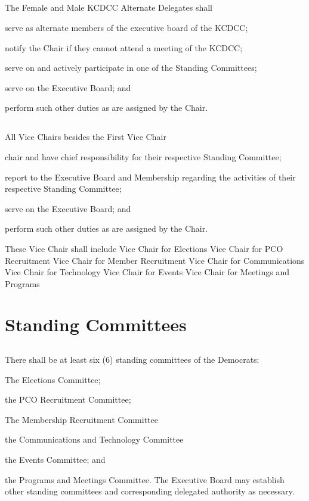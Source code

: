 \subsection{}
The Female and Male KCDCC Alternate Delegates shall
\begin{inlinealphalist}
    \item serve as alternate members of the executive board of the KCDCC;
    \item notify the Chair if they cannot attend a meeting of the KCDCC;
    \item serve on and actively participate in one of the Standing Committees;
    \item serve on the Executive Board; and
    \item perform such other duties as are assigned by the Chair.
\end{inlinealphalist}

\subsection{}
All Vice Chairs besides the First Vice Chair
\begin{inlinealphalist}
    \item chair and have chief responsibility for their respective Standing Committee;
    \item report to the Executive Board and Membership regarding the activities of their respective Standing Committee;
    \item serve on the Executive Board; and
    \item perform such other duties as are assigned by the Chair.
\end{inlinealphalist}

These Vice Chair shall include
Vice Chair for Elections
Vice Chair for PCO Recruitment
Vice Chair for Member Recruitment
Vice Chair for Communications
Vice Chair for Technology
Vice Chair for Events
Vice Chair for Meetings and Programs

\section{Standing Committees}
\subsection{} \label{standing-committee-list}
There shall be at least six (6) standing committees of the \fortythird{}  Democrats:
\begin{inlinealphalist}
    \item The Elections Committee;
    \item the PCO Recruitment Committee;
    \item The Membership Recruitment Committee
    \item the Communications and Technology Committee
    \item the Events Committee; and
    \item the Programs and Meetings Committee. The Executive Board may establish other standing committees and corresponding delegated authority as necessary.
\end{inlinealphalist}

